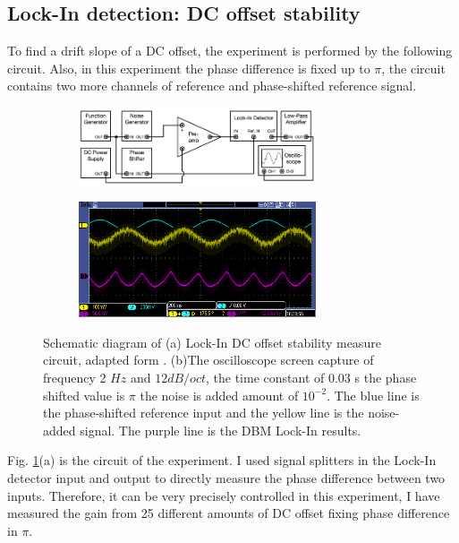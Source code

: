 \documentclass{article}
\begin{document}
\subsection{Lock-In detection: DC offset stability}
 To find a drift slope of a DC offset, the experiment is performed by the following circuit.
 Also, in this experiment the phase difference is fixed up to $\pi$, the circuit contains two more channels of reference and phase-shifted reference signal.
 \begin{figure}[ht]
    \centering
    \begin{subfigure}[b]{7cm}
        \centering
        \includegraphics[width=7cm]{../results/DC_off_set_circuit.png}
        \caption{}
    \end{subfigure}
    \hfill
    \begin{subfigure}[b]{7cm}
        \centering
        \includegraphics[width=7cm]{../raw_data/TEK00640.PNG}
        \caption{}
    \end{subfigure}
    \hfill
    \caption{Schematic diagram of (a) Lock-In DC offset stability measure circuit, adapted form  \cite{signal_processor}.
    (b)The oscilloscope screen capture of frequency 2 $Hz$ and $12 dB/oct$, the time constant of $0.03$ s the phase shifted value is $\pi$ the noise is added amount of $10^{-2}$.
    The blue line is the phase-shifted reference input and the yellow line is the noise-added signal.
    The purple line is the DBM Lock-In results.
    }
    \label{fig: DC_off_set_circuit}
  \end{figure}
 Fig. \ref{fig: DC_off_set_circuit}(a) is the circuit of the experiment.
 I used signal splitters in the Lock-In detector input and output to directly measure the phase difference between two inputs.
 Therefore, it can be very precisely controlled in this experiment, I have measured the gain from 25 different amounts of DC offset fixing phase difference in $\pi$.
\end{document}

